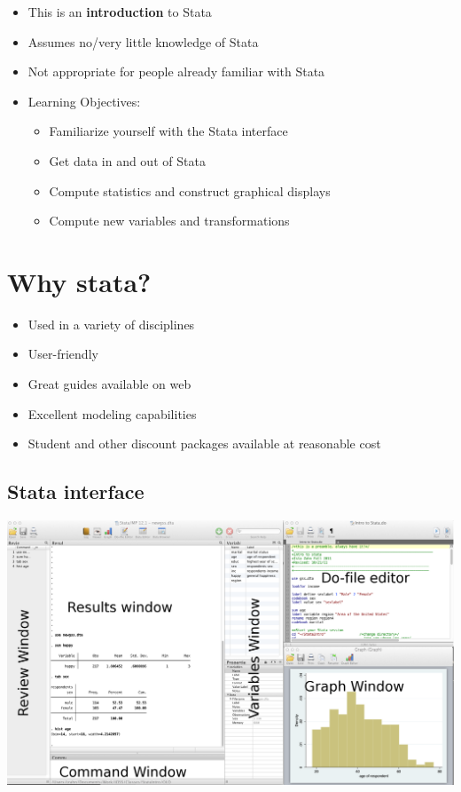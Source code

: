 \documentclass[]{book}
\providecommand{\tightlist}{%
  \setlength{\itemsep}{0pt}\setlength{\parskip}{0pt}}
\begin{document}
\begin{itemize}
\tightlist
\item
  This is an \textbf{introduction} to Stata
\item
  Assumes no/very little knowledge of Stata
\item
  Not appropriate for people already familiar with Stata
\item
  Learning Objectives:

  \begin{itemize}
  \tightlist
  \item
    Familiarize yourself with the Stata interface
  \item
    Get data in and out of Stata
  \item
    Compute statistics and construct graphical displays
  \item
    Compute new variables and transformations
  \end{itemize}
\end{itemize}

\hypertarget{why-stata}{%
\section{Why stata?}\label{why-stata}}

\begin{itemize}
\tightlist
\item
  Used in a variety of disciplines
\item
  User-friendly
\item
  Great guides available on web
\item
  Excellent modeling capabilities
\item
  Student and other discount packages available at reasonable cost
\end{itemize}

\hypertarget{stata-interface}{%
\subsection{Stata interface}\label{stata-interface}}

\includegraphics{Stata/StataIntro/images/StataInterface.png}
\end{document}
